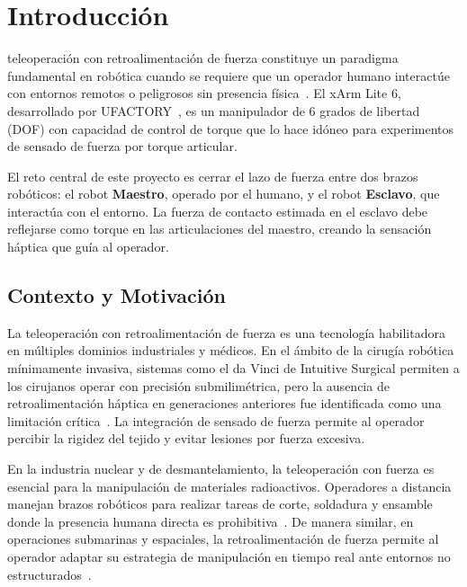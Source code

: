 \documentclass[journal,10pt,twoside]{IEEEtran}
\begin{document}
\section{Introducción}

 teleoperación con retroalimentación de fuerza
constituye un paradigma fundamental en robótica cuando se requiere que
un operador humano interactúe con entornos remotos o peligrosos sin
presencia física~\cite{murray1994}. El xArm Lite 6, desarrollado por
UFACTORY~\cite{xarm_github}, es un manipulador de 6 grados de libertad
(DOF) con capacidad de control de torque que lo hace idóneo para experimentos
de sensado de fuerza por torque articular.

\begin{theorybox}[Motivación]
  El reto central de este proyecto es cerrar el lazo de fuerza entre
  dos brazos robóticos: el robot \textbf{Maestro}, operado por el humano,
  y el robot \textbf{Esclavo}, que interactúa con el entorno.
  La fuerza de contacto estimada en el esclavo debe reflejarse como
  torque en las articulaciones del maestro, creando la sensación
  háptica que guía al operador.
\end{theorybox}

\subsection{Contexto y Motivación}

La teleoperación con retroalimentación de fuerza es una tecnología
habilitadora en múltiples dominios industriales y médicos. En el ámbito
de la cirugía robótica mínimamente invasiva, sistemas como el da Vinci
de Intuitive Surgical permiten a los cirujanos operar con precisión
submilimétrica, pero la ausencia de retroalimentación háptica en
generaciones anteriores fue identificada como una limitación
crítica~\cite{niemeyer2008}. La integración de sensado de fuerza
permite al operador percibir la rigidez del tejido y evitar lesiones
por fuerza excesiva.

En la industria nuclear y de desmantelamiento, la teleoperación con
fuerza es esencial para la manipulación de materiales radioactivos.
Operadores a distancia manejan brazos robóticos para realizar tareas
de corte, soldadura y ensamble donde la presencia humana directa es
prohibitiva~\cite{siciliano2009}. De manera similar, en operaciones
submarinas y espaciales, la retroalimentación de fuerza permite
al operador adaptar su estrategia de manipulación en tiempo real
ante entornos no estructurados~\cite{thompson2001}.
\end{document}
